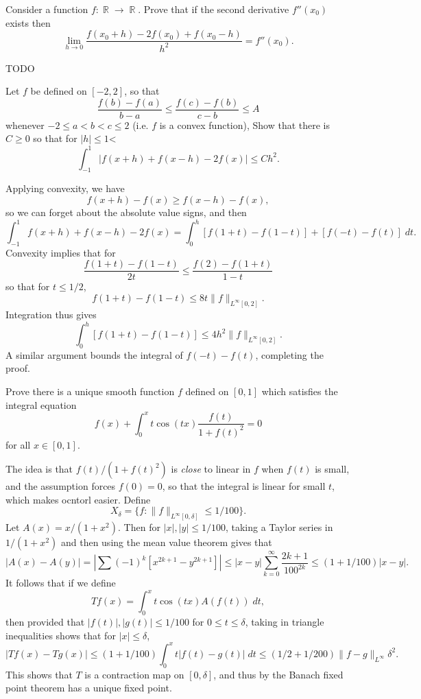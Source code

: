 \documentclass[answers]{exam}
\DeclareMathOperator{\RR}{\mathbb{R}}
\begin{document}
\begin{questions}
\question Consider a function $f: \RR \to \RR$. Prove that if the second derivative $f''(x_0)$ exists then
%
\[ \lim_{h \to 0} \frac{f(x_0 + h) - 2 f(x_0) + f(x_0 - h)}{h^2} = f''(x_0). \]
\begin{solution}
	TODO
\end{solution}

\question Let $f$ be defined on $[-2,2]$, so that
%
\[ \frac{f(b) - f(a)}{b - a} \leq \frac{f(c) - f(b)}{c - b} \leq A \]
%
whenever $-2 \leq a < b < c \leq 2$ (i.e. $f$ is a convex function), Show that there is $C \geq 0$ so that for $|h| \leq 1$<
%
\[ \int_{-1}^1 |f(x+h) + f(x - h) - 2f(x)| \leq C h^2. \]
\begin{solution}
	Applying convexity, we have
	\[ f(x + h) - f(x) \geq f(x - h) - f(x), \]
	so we can forget about the absolute value signs, and then
	\[ \int_{-1}^1 f(x + h) + f(x - h) - 2f(x) = \int_0^h [f(1+t) - f(1 - t)] + [ f(-t) - f(t) ]\; dt. \]
	Convexity implies that for
	\[ \frac{f(1 + t) - f(1 - t)}{2t} \leq \frac{f(2) - f(1 + t)}{1 - t} \]
	so that for $t \leq 1/2$,
	\[ f(1 + t) - f(1 - t) \leq 8t \| f \|_{L^\infty[0,2]}. \]
	Integration thus gives
	\[ \int_0^h [ f(1+t) - f(1 - t) ] \leq 4h^2 \| f \|_{L^\infty[0,2]}. \]	
	A similar argument bounds the integral of $f(-t) - f(t)$, completing the proof.
\end{solution}

\question Prove there is a unique smooth function $f$ defined on $[0,1]$ which satisfies the integral equation
%
\[ f(x) + \int_0^x t \cos(tx) \frac{f(t)}{1 + f(t)^2} = 0 \]
%
for all $x \in [0,1]$.
\begin{solution}
	The idea is that $f(t) / (1 + f(t)^2)$ is \emph{close} to linear in $f$ when $f(t)$ is small, and the assumption forces $f(0) = 0$, so that the integral is linear for small $t$, which makes ocntorl easier. Define
	\[ X_\delta = \{ f : \| f \|_{L^\infty[0,\delta]} \leq 1/100 \}. \]
	Let $A(x) = x/(1 + x^2)$. Then for $|x|,|y| \leq 1/100$, taking a Taylor series in $1/(1 + x^2)$ and then using the mean value theorem gives that
	\[ |A(x) - A(y)| = |\sum (-1)^k [ x^{2k+1} - y^{2k + 1} ]| \leq |x - y| \sum_{k = 0}^\infty \frac{2k + 1}{100^{2k}} \leq (1 + 1/100)|x - y|. \]
	It follows that if we define
	\[ Tf(x) = \int_0^x t \cos(tx) A(f(t))\; dt, \]
	then provided that $|f(t)|, |g(t)| \leq 1/100$ for $0 \leq t \leq \delta$, taking in triangle inequalities shows that for $|x| \leq \delta$,
	\[ |Tf(x) - Tg(x)| \leq (1 + 1/100) \int_0^x t |f(t) - g(t)|\; dt \leq (1/2 + 1/200) \| f - g \|_{L^\infty} \delta^2.  \]
	This shows that $T$ is a contraction map on $[0,\delta]$, and thus by the Banach fixed point theorem has a unique fixed point.


\end{solution}
\end{questions}
\end{document}
